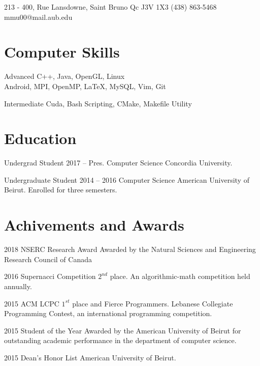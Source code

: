 \documentclass{tccv}
\begin{document}
\personal
    {213 - 400,  Rue Lansdowne, Saint Bruno \hspace{1cm} Qc J3V 1X3}
    {(438) 863-5468}
    {mmu00@mail.aub.edu}
    
\section{Computer Skills}

\begin{factlist}

\item{Advanced}
     {C++, Java, OpenGL, Linux\\Android, MPI, OpenMP, \LaTeX, MySQL, Vim, Git}


\item{Intermediate}
     {Cuda, Bash Scripting, CMake, Makefile Utility}

\end{factlist}    
    

\section{Education}

\begin{yearlist}

\item[Undergrad Student]{2017 -- Pres.}
     {Computer Science } 
     {Concordia University.}

\item[Undergraduate Student]{2014 -- 2016}
     {Computer Science} 
     {American University of Beirut. Enrolled for three semesters.}



\end{yearlist}



\section{Achivements and Awards}

\begin{yearlist}

\item{2018}
     {NSERC Research Award}
     {Awarded by the Natural Sciences and Engineering Research Council of Canada}


\item{2016}
     {Supernacci Competition}
     {$2^{nd}$ place. An algorithmic-math competition held annually.}

\item{2015}
     {ACM LCPC}
     {$1^{st}$ place and Fierce Programmers. Lebanese Collegiate Programming Contest, an international programming competition.}

\item{2015}
     {Student of the Year}
     {Awarded by the American University of Beirut for outstanding academic performance in the department of computer science.}

\item{2015}
     {Dean's Honor List}
     {American University of Beirut.}

\end{yearlist}
\end{document}
